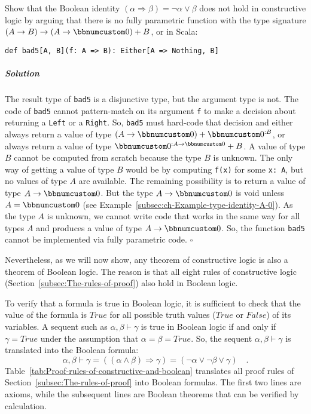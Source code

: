 Show that the Boolean identity $\left(\alpha\Rightarrow\beta\right)=\neg\alpha\vee\beta$
does not hold in constructive logic by arguing that there is no fully
parametric function with the type signature $\left(A\rightarrow B\right)\rightarrow(A\rightarrow\bbnum 0)+B$,
or in Scala:
\begin{lstlisting}
def bad5[A, B](f: A => B): Either[A => Nothing, B]
\end{lstlisting}


\subparagraph{Solution}

The result type of \lstinline!bad5! is a disjunctive type, but the
argument type is not. The code of \lstinline!bad5! cannot pattern-match
on its argument \lstinline!f! to make a decision about returning
a \lstinline!Left! or a \lstinline!Right!. So, \lstinline!bad5!
must hard-code that decision and either always return a value of type
$(A\rightarrow\bbnum 0)+\bbnum 0^{:B}$, or always return a value
of type $\bbnum 0^{:A\rightarrow\bbnum 0}+B$. A value of type $B$
cannot be computed from scratch because the type $B$ is unknown.
The only way of getting a value of type $B$ would be by computing
\lstinline!f(x)! for some \lstinline!x: A!, but no values of type
$A$ are available. The remaining possibility is to return a value
of type $A\rightarrow\bbnum 0$. But the type $A\rightarrow\bbnum 0$
is void unless $A=\bbnum 0$ (see Example~\ref{subsec:ch-Example-type-identity-A-0}).
As the type $A$ is unknown, we cannot write code that works in the
same way for all types $A$ and produces a value of type $A\rightarrow\bbnum 0$.
So, the function \lstinline!bad5! cannot be implemented via fully
parametric code. $\square$

Nevertheless, as we will now show, any theorem of constructive logic
is also a theorem of Boolean logic. The reason is that all eight rules
of constructive logic (Section~\ref{subsec:The-rules-of-proof})
also hold in Boolean logic.

To verify that a formula is true in Boolean logic, it is sufficient
 to check that the value of the formula is $True$ for all possible
truth values ($True$ or $False$) of its variables. A sequent such
as $\alpha,\beta\vdash\gamma$ is true in Boolean logic if and only
if $\gamma=True$ under the assumption that $\alpha=\beta=True$.
So, the sequent $\alpha,\beta\vdash\gamma$ is translated into the
Boolean formula:
\[
\alpha,\beta\vdash\gamma=\left(\left(\alpha\wedge\beta\right)\Rightarrow\gamma\right)=\left(\neg\alpha\vee\neg\beta\vee\gamma\right)\quad.
\]
Table~\ref{tab:Proof-rules-of-constructive-and-boolean} translates
all proof rules of Section~\ref{subsec:The-rules-of-proof} into
Boolean formulas. The first two lines are axioms, while the subsequent
lines are Boolean theorems that can be verified by calculation.

